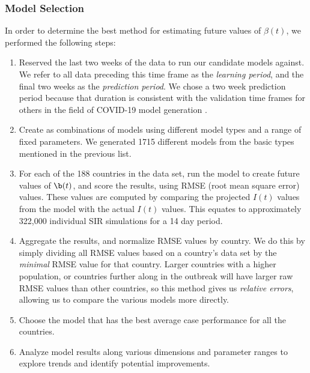 \documentclass[11pt]{article}
\begin{document}
\subsubsection{Model Selection}
In order to determine the best method for estimating future values of $\beta(t)$, we performed the following steps:
\begin{enumerate}
    \item Reserved the last two weeks of the data to run our candidate models against. We refer to all data preceding this time frame as the \textit{learning period}, and the final two weeks as the \textit{prediction period}. We chose a two week prediction period because that duration is consistent with the validation time frames  for others in the field of COVID-19 model generation \cite{latest-models}. 
    \item Create as combinations of models using different model types and a range of fixed parameters. We generated  1715 different models from the basic types mentioned in the previous list.
    \item For each of the 188 countries in the data set, run the model to create future values of $\b(t)$, and score the results, using RMSE (root mean square error) values. These values are computed by comparing the projected $I(t)$ values from the model with the actual $I(t)$ values. This equates to approximately 322,000 individual SIR simulations for a 14 day period.
    \item Aggregate the results, and normalize RMSE values by country. We do this by simply dividing all RMSE values based on a country's data set by the \textit{minimal} RMSE value for that country. Larger countries with a higher population, or countries further along in the outbreak will have larger raw RMSE values than other countries, so this method gives us \textit{relative errors}, allowing us to compare the various models more directly.
    \item Choose the model that has the best average case performance for all the countries.
    \item Analyze model results along various dimensions and parameter ranges to explore trends and identify potential improvements.
\end{enumerate}
\end{document}
